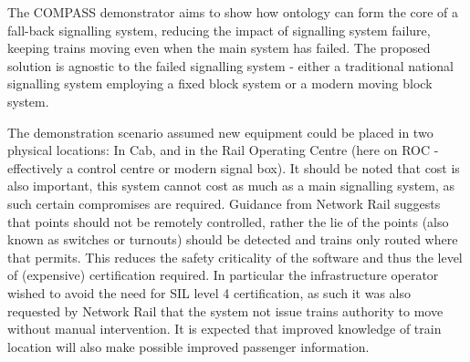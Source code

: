 The COMPASS demonstrator aims to show how ontology can form the core of a fall-back signalling system, reducing the impact of signalling system failure, keeping trains moving even when the main system has failed. The proposed solution is agnostic to the failed signalling system - either a traditional national signalling system employing a fixed block system or a modern moving block system.

The demonstration scenario assumed new equipment could be placed in two physical locations: In Cab, and in the Rail Operating Centre (here on ROC - effectively a control centre or modern signal box). It should be noted that cost is also important, this system cannot cost as much as a main signalling system, as such certain compromises are required. Guidance from Network Rail suggests that points should not be remotely controlled, rather the lie of the points (also known as switches or turnouts) should be detected and trains only routed where that permits. This reduces the safety criticality of the software and thus the level of (expensive) certification required. In particular the infrastructure operator wished to avoid the need for SIL level 4 certification, as such it was also requested by Network Rail that the system not issue trains authority to move without manual intervention. It is expected that improved knowledge of train location will also make possible improved passenger information.

